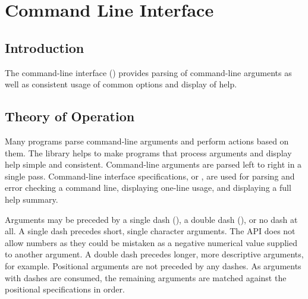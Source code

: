 %
%
%

\chapter {Command Line Interface}\label{chap:cli}

\section {Introduction}

The command-line interface () provides parsing of
command-line arguments as well as consistent usage of common options
and display of help.

\section {Theory of Operation}

Many programs parse command-line arguments and perform actions based
on them.  The  library helps to make programs that process
arguments and display help simple and consistent. Command-line
arguments are parsed left to right in a single pass. Command-line
interface specifications, or , are used for parsing
and error checking a command line, displaying one-line usage, and
displaying a full help summary.

Arguments may be preceded by a single dash (\sopt{}), a double
dash (\lopt{}), or no dash at all.
A single dash precedes short, single character arguments. The API does
not allow numbers as they could be mistaken as a negative numerical
value supplied to another argument. A double dash precedes longer,
more descriptive arguments,  for example.
Positional arguments are not preceded by any dashes.  As arguments
with dashes are consumed, the remaining arguments are matched against
the positional specifications in order.

